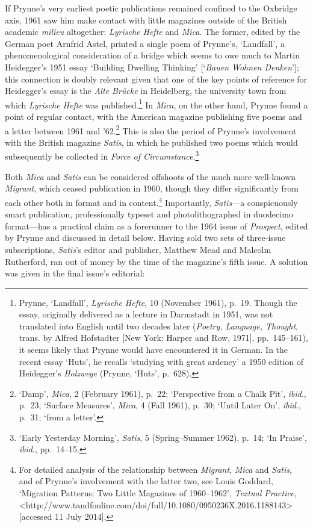 \documentclass[]{article}
\begin{document}
If Prynne's very earliest poetic publications remained confined to the
Oxbridge axis, 1961 saw him make contact with little magazines outside
of the British academic \emph{milieu} altogether: \emph{Lyrische Hefte}
and \emph{Mica}. The former, edited by the German poet Arnfrid Astel,
printed a single poem of Prynne's, `Landfall', a phenomenological
consideration of a bridge which seems to owe much to Martin Heidegger's
1951 essay `Building Dwelling Thinking' {[}`\emph{Bauen Wohnen
Denken}'{]}; this connection is doubly relevant given that one of the
key points of reference for Heidegger's essay is the \emph{Alte Brücke}
in Heidelberg, the university town from which \emph{Lyrische Hefte} was
published.\footnote{Prynne, `Landfall', \emph{Lyrische Hefte}, 10
  (November 1961), p.~19. Though the essay, originally delivered as a
  lecture in Darmstadt in 1951, was not translated into English until
  two decades later (\emph{Poetry, Language, Thought}, trans. by Alfred
  Hofstadter {[}New York: Harper and Row, 1971{]}, pp.~145--161), it
  seems likely that Prynne would have encountered it in German. In the
  recent essay `Huts', he recalls `studying with great ardency' a 1950
  edition of Heidegger's \emph{Holzwege} (Prynne, `Huts', p.~628).} In
\emph{Mica}, on the other hand, Prynne found a point of regular contact,
with the American magazine publishing five poems and a letter between
1961 and '62.\footnote{`Damp', \emph{Mica}, 2 (February 1961), p.~22;
  `Perspective from a Chalk Pit', \emph{ibid}., p.~23; `Surface
  Measures', \emph{Mica}, 4 (Fall 1961), p.~30; `Until Later On',
  \emph{ibid}., p.~31; `from a letter'.} This is also the period of
Prynne's involvement with the British magazine \emph{Satis}, in which he
published two poems which would subsequently be collected in \emph{Force
of Circumstance}.\footnote{`Early Yesterday Morning', \emph{Satis}, 5
  (Spring--Summer 1962), p.~14; `In Praise', \emph{ibid}., pp.~14--15.}

Both \emph{Mica} and \emph{Satis} can be considered offshoots of the
much more well-known \emph{Migrant}, which ceased publication in 1960,
though they differ significantly from each other both in format and in
content.\footnote{For detailed analysis of the relationship between
  \emph{Migrant}, \emph{Mica} and \emph{Satis}, and of Prynne's
  involvement with the latter two, see Louis Goddard, `Migration
  Patterns: Two Little Magazines of 1960--1962', \emph{Textual
  Practice},
  \textless{}http://www.tandfonline.com/doi/full/10.1080/0950236X.2016.1188143\textgreater{}
  {[}accessed 11 July 2014{]}.} Importantly, \emph{Satis}---a
conspicuously smart publication, professionally typeset and
photolithographed in duodecimo format---has a practical claim as a
forerunner to the 1964 issue of \emph{Prospect}, edited by Prynne and
discussed in detail below. Having sold two sets of three-issue
subscriptions, \emph{Satis}'s editor and publisher, Matthew Mead and
Malcolm Rutherford, ran out of money by the time of the magazine's fifth
issue. A solution was given in the final issue's editorial:
\end{document}
